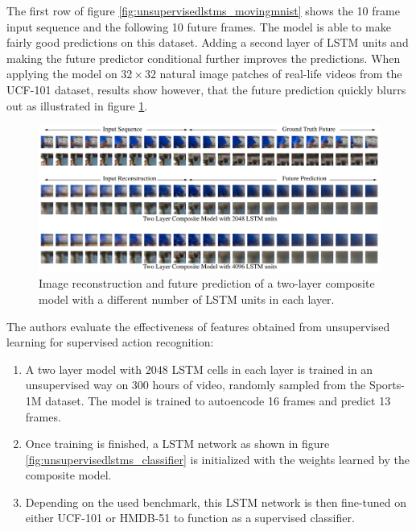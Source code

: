 The first row of figure \ref{fig:unsupervisedlstms_movingmnist} shows the 10 frame input sequence and the following 10 future frames.
The model is able to make fairly good predictions on this dataset.
Adding a second layer of LSTM units and making the future predictor conditional further improves the predictions.
When applying the model on $32 \times 32$ natural image patches of real-life videos from the UCF-101 dataset, results show however, that the future prediction quickly blurrs out as illustrated in figure \ref{fig:unsupervisedlstms_ucfpatches}.

\begin{figure}[H]
    \centering
    \includegraphics[width=\textwidth]{img_deep/unsupervisedlstms_ucfpatches.png}
    \caption{Image reconstruction and future prediction of a two-layer composite model with a different number of LSTM units in each layer. \cite{srivastava_unsupervised_2015}}
    \label{fig:unsupervisedlstms_ucfpatches}
\end{figure}

The authors evaluate the effectiveness of features obtained from unsupervised learning for supervised action recognition:

\begin{enumerate}
    \item A two layer model with $2048$ LSTM cells in each layer is trained in an unsupervised way on 300 hours of video, randomly sampled from the Sports-1M dataset.
        The model is trained to autoencode 16 frames and predict 13 frames.
    \item Once training is finished, a LSTM network as shown in figure \ref{fig:unsupervisedlstms_classifier} is initialized with the weights learned by the composite model.
    \item Depending on the used benchmark, this LSTM network is then fine-tuned on either UCF-101 or HMDB-51 to function as a supervised classifier.
\end{enumerate}

